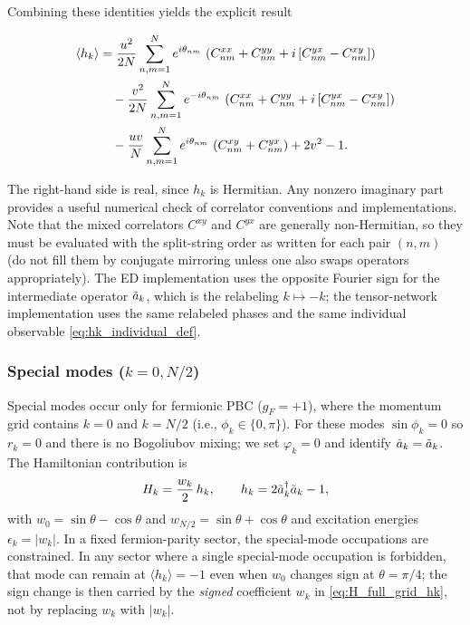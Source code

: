\documentclass[aps,prx,twocolumn,superscriptaddress,nofootinbib,nolongbibliography,nobalancelastpage,10pt,floatfix]{revtex4-2}
\begin{document}
Combining these identities yields the explicit result
\begin{widetext}
    \begin{align}
        \langle h_k \rangle
        &= \frac{u^2}{2N}\sum_{n,m=1}^N e^{i\theta_{nm}}\,
           \left(C^{xx}_{nm}+C^{yy}_{nm}+ i\,[C^{yx}_{nm}-C^{xy}_{nm}]\right)\nonumber\\
        &\quad
        - \frac{v^2}{2N}\sum_{n,m=1}^N e^{-i\theta_{nm}}\,
           \left(C^{xx}_{nm}+C^{yy}_{nm}+ i\,[C^{yx}_{nm}-C^{xy}_{nm}]\right)\nonumber\\
        &\quad
        - \frac{uv}{N}\sum_{n,m=1}^N e^{i\theta_{nm}}\,
           \left(C^{xy}_{nm}+C^{yx}_{nm}\right)
        +2v^2-1.
        \label{eq:hk_final}
    \end{align}
\end{widetext}
The right-hand side is real, since $h_k$ is Hermitian. Any nonzero imaginary part provides a useful numerical check of correlator conventions and implementations. Note that the mixed correlators $C^{xy}$ and $C^{yx}$ are generally non-Hermitian, so they must be evaluated with the split-string order as written for each pair $(n,m)$ (do not fill them by conjugate mirroring unless one also swaps operators appropriately). The ED implementation uses the opposite Fourier sign for the intermediate operator $\tilde{a}_k$, which is the relabeling $k\mapsto -k$; the tensor-network implementation uses the same relabeled phases and the same individual observable \cref{eq:hk_individual_def}.

\subsubsection{Special modes ($k=0, N/2$)}

Special modes occur only for fermionic PBC ($g_F=+1$), where the momentum grid contains $k=0$ and $k=N/2$ (i.e., $\phi_k\in\{0,\pi\}$).
For these modes $\sin\phi_k=0$ so $r_k=0$ and there is no Bogoliubov mixing; we set $\varphi_k=0$ and identify $\hat{a}_k=\tilde{a}_k$.
The Hamiltonian contribution is
\begin{align}
    H_k = \frac{w_k}{2}\,h_k,\qquad h_k = 2\tilde{a}_k^\dag \tilde{a}_k - 1,
\end{align}
with $w_0=\sin\theta-\cos\theta$ and $w_{N/2}=\sin\theta+\cos\theta$ and excitation energies $\epsilon_k=|w_k|$.
In a fixed fermion-parity sector, the special-mode occupations are constrained. In any sector where a single special-mode occupation is forbidden, that mode can remain at $\langle h_k\rangle=-1$ even when $w_0$ changes sign at $\theta=\pi/4$; the sign change is then carried by the \emph{signed} coefficient $w_k$ in \cref{eq:H_full_grid_hk}, not by replacing $w_k$ with $|w_k|$.
\end{document}
